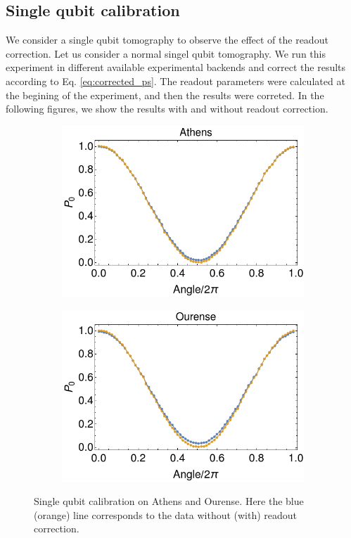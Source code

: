 \subsection{Single qubit calibration}

We consider a single qubit tomography to observe the effect of the readout correction. Let us consider a normal singel qubit tomography. We run this experiment in different available experimental backends and correct the results according to Eq. \ref{eq:corrected_ps}. The readout parameters were calculated at the begining of the experiment, and then the results were correted. In the following figures, we show the results with and without readout correction.

\begin{figure}[H]
    \centering
    \begin{subfigure}{.5\textwidth}
      \centering
      \includegraphics[width=\textwidth]{Figures/Calibrations/calibration_athens.png}
    \end{subfigure}%
    \begin{subfigure}{.5\textwidth}
      \centering
      \includegraphics[width=\textwidth]{Figures/Calibrations/calibration_ourense.png}
    \end{subfigure}
    \caption{Single qubit calibration on Athens and Ourense. Here the blue (orange) line corresponds to the data without (with) readout correction.}
    \label{fig:pc_yorktown_sphere}
\end{figure}

